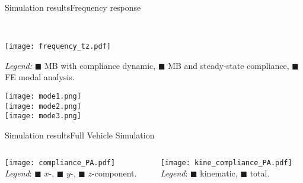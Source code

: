 \begin{frame}{Simulation results}{Frequency response}
  \begin{minipage}[c]{0.69\linewidth}
     \\[0.25em]
    {\footnotesize{
    \texttt{[image: frequency\_tz.pdf]}
    \begin{center}
      \emph{Legend:}
      {\color{mycolor1}$\blacksquare$} MB with compliance dynamic, {\color{mycolor2}$\blacksquare$} MB and steady-state compliance, {\color{mycolor3}$\blacksquare$} \Ansys \ac{FE} modal analysis.
    \end{center}
    }}
  \end{minipage}
  \hfill
  \begin{minipage}[c]{0.3\linewidth}
    \texttt{[image: mode1.png]}  \\
    \texttt{[image: mode2.png]}  \\
    \texttt{[image: mode3.png]}  \\
  \end{minipage}
\end{frame}

\begin{frame}{Simulation results}{Full Vehicle Simulation}
  \begin{columns}
  \begin{column}{0.55\textwidth}
    \texttt{[image: compliance\_PA.pdf]}\\
    \emph{Legend}: {\color{mycolor1}$\blacksquare$} $x$-, {\color{mycolor2}$\blacksquare$} $y$-, {\color{mycolor3}$\blacksquare$} $z$-component.
  \end{column}
  \begin{column}{0.47\textwidth}
    \texttt{[image: kine\_compliance\_PA.pdf]}\\
    \emph{Legend}: {\color{mycolor1}$\blacksquare$} kinematic, {\color{mycolor2}$\blacksquare$} total.
  \end{column}
  \end{columns}
\end{frame}

